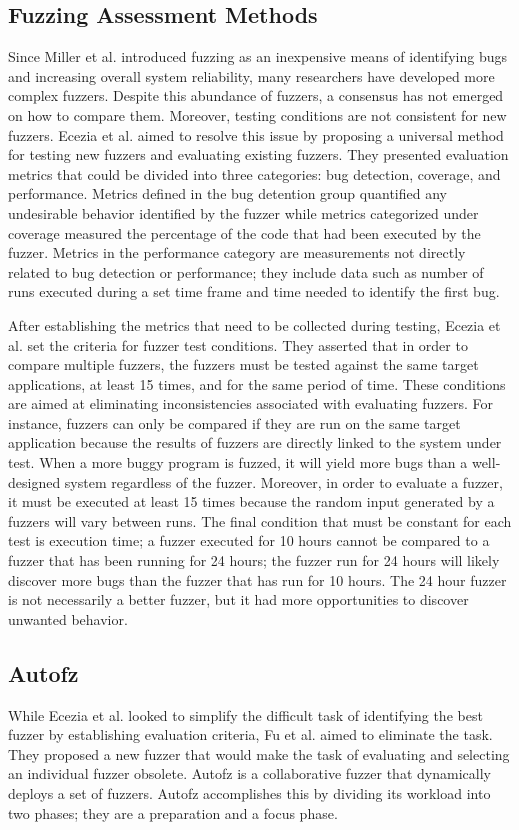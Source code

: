 \subsection{Fuzzing Assessment Methods}
Since Miller et al. introduced fuzzing as an inexpensive means of identifying bugs
and increasing overall system reliability, many researchers have developed more
complex fuzzers. Despite this abundance of fuzzers, a consensus has not emerged
on how to compare them. Moreover, testing conditions are not consistent for new fuzzers.
Ecezia et al. aimed to resolve this issue by proposing a universal method for testing new
fuzzers and evaluating existing fuzzers. They presented evaluation metrics that could be
divided into three categories: bug detection, coverage, and performance. Metrics defined
in the bug detention group quantified any undesirable behavior identified by the fuzzer
while metrics categorized under coverage measured the percentage of the code that had
been executed by the fuzzer. Metrics in the performance category are measurements not
directly related to bug detection or performance; they include data such as number of
runs executed during a set time frame and time needed to identify the first bug.

After establishing the metrics that need to be collected during testing, Ecezia et al.
set the criteria for fuzzer test conditions. They asserted that in order to compare
multiple fuzzers, the fuzzers must be tested against the same target applications, at
least 15 times, and for the same period of time. These conditions are aimed at eliminating
inconsistencies associated with evaluating fuzzers. For instance, fuzzers can only be
compared if they are run on the same target application because the results of fuzzers
are directly linked to the system under test. When a more buggy program is fuzzed, it
will yield more bugs than a well-designed system regardless of the fuzzer. Moreover,
in order to evaluate a fuzzer, it must be executed at least 15 times because the random
input generated by a fuzzers will vary between runs. The final condition that must be
constant for each test is execution time; a fuzzer executed for 10 hours cannot be
compared to a fuzzer that has been running for 24 hours; the fuzzer run for 24 hours
will likely discover more bugs than the fuzzer that has run for 10 hours. The 24 hour
fuzzer is not necessarily a better fuzzer, but it had more opportunities to discover
unwanted behavior. \cite{Ecezia}

\subsection{Autofz}
While Ecezia et al. looked to simplify the difficult task of identifying the best
fuzzer by establishing evaluation criteria, Fu et al. aimed to eliminate the task.
They proposed a new fuzzer that would make the task of evaluating and selecting an
individual fuzzer obsolete. Autofz is a collaborative fuzzer that dynamically deploys
a set of fuzzers. Autofz accomplishes this by dividing its workload into two phases;
they are a preparation and a focus phase.

